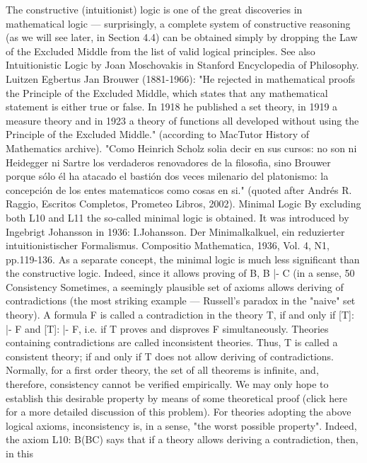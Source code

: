 The constructive (intuitionist) logic is one of the great discoveries in mathematical logic --- surprisingly, a
complete system of constructive reasoning (as we will see later, in Section 4.4) can be obtained simply by
dropping the Law of the Excluded Middle from the list of valid logical principles.
See also Intuitionistic Logic by Joan Moschovakis in Stanford Encyclopedia of Philosophy.
Luitzen Egbertus Jan Brouwer (1881-1966): "He rejected in mathematical proofs the Principle of the Excluded Middle, which
states that any mathematical statement is either true or false. In 1918 he published a set theory, in 1919 a measure theory and in
1923 a theory of functions all developed without using the Principle of the Excluded Middle." (according to MacTutor History
of Mathematics archive). "Como Heinrich Scholz solia decir en sus cursos: no son ni Heidegger ni Sartre los verdaderos
renovadores de la filosofia, sino Brouwer porque sólo él ha atacado el bastión dos veces milenario del platonismo: la
concepción de los entes matematicos como cosas en si." (quoted after Andrés R. Raggio, Escritos Completos, Prometeo Libros,
2002).
Minimal Logic
By excluding both L10 and L11 the so-called minimal logic is obtained. It was introduced by Ingebrigt
Johansson in 1936:
I.Johansson. Der Minimalkalkuel, ein reduzierter intuitionistischer Formalismus. Compositio Mathematica, 1936, Vol. 4, N1,
pp.119-136.
As a separate concept, the minimal logic is much less significant than the constructive logic. Indeed, since
it allows proving of \neg B, B |- \neg C (in a sense, 50%
Consistency
Sometimes, a seemingly plausible set of axioms allows deriving of contradictions (the most striking
example --- Russell's paradox in the "naive" set theory). A formula F is called a contradiction in the
theory T, if and only if [T]: |- F and [T]: |- \neg F, i.e. if T proves and disproves F simultaneously. Theories
containing contradictions are called inconsistent theories. Thus, T is called a consistent theory; if and
only if T does not allow deriving of contradictions.
Normally, for a first order theory, the set of all theorems is infinite, and, therefore, consistency cannot be
verified empirically. We may only hope to establish this desirable property by means of some
theoretical proof (click here for a more detailed discussion of this problem).
For theories adopting the above logical axioms, inconsistency is, in a sense, "the worst possible property".
Indeed, the axiom L10: \neg B\IMPLIES (B\IMPLIES C) says that if a theory allows deriving a contradiction, then, in this

